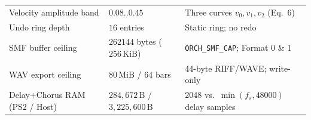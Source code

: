 \begin{table}[htbp]
\begin{tabularx}{\textwidth}{@{}llX@{}}
Velocity amplitude band & $0.08..0.45$ & Three curves $v_0, v_1, v_2$ (Eq.~6) \\
Undo ring depth & $16$ entries & Static ring; no redo \\
SMF buffer ceiling & $262144$ bytes ($256\,\text{KiB}$) & \texttt{ORCH\_SMF\_CAP}; Format 0 \& 1 \\
WAV export ceiling & $80\,\mathrm{MiB}$ / $64$ bars & 44-byte RIFF/WAVE; write-only \\
Delay+Chorus RAM (PS2 / Host) & $284,672\,\text{B}$ / $3,225,600\,\text{B}$ & 2048 vs.\ $\min(f_s, 48000)$ delay samples \\
\bottomrule
\end{tabularx}
\end{table}
